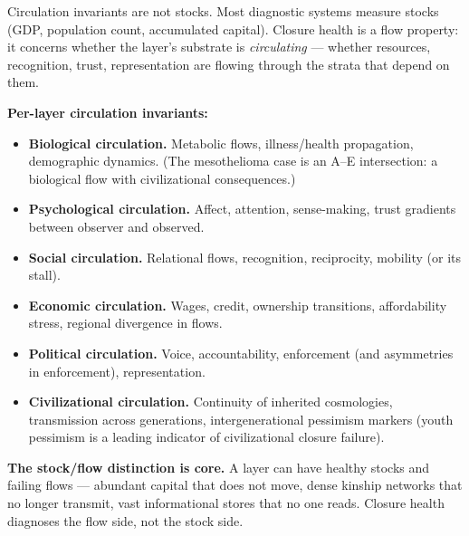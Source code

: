 \documentclass[
]{article}
\providecommand{\tightlist}{%
  \setlength{\itemsep}{0pt}\setlength{\parskip}{0pt}}
\begin{document}
Circulation invariants are not stocks. Most diagnostic systems measure
stocks (GDP, population count, accumulated capital). Closure health is
a flow property: it concerns whether the layer's substrate is
\emph{circulating} --- whether resources, recognition, trust,
representation are flowing through the strata that depend on them.

\textbf{Per-layer circulation invariants:}

\begin{itemize}
\tightlist
\item
  \textbf{Biological circulation.} Metabolic flows, illness/health
  propagation, demographic dynamics. (The mesothelioma case is an
  A--E intersection: a biological flow with civilizational
  consequences.)
\item
  \textbf{Psychological circulation.} Affect, attention, sense-making,
  trust gradients between observer and observed.
\item
  \textbf{Social circulation.} Relational flows, recognition,
  reciprocity, mobility (or its stall).
\item
  \textbf{Economic circulation.} Wages, credit, ownership transitions,
  affordability stress, regional divergence in flows.
\item
  \textbf{Political circulation.} Voice, accountability, enforcement
  (and asymmetries in enforcement), representation.
\item
  \textbf{Civilizational circulation.} Continuity of inherited
  cosmologies, transmission across generations, intergenerational
  pessimism markers (youth pessimism is a leading indicator of
  civilizational closure failure).
\end{itemize}

\textbf{The stock/flow distinction is core.} A layer can have
healthy stocks and failing flows --- abundant capital that does not
move, dense kinship networks that no longer transmit, vast
informational stores that no one reads. Closure health diagnoses the
flow side, not the stock side.
\end{document}
